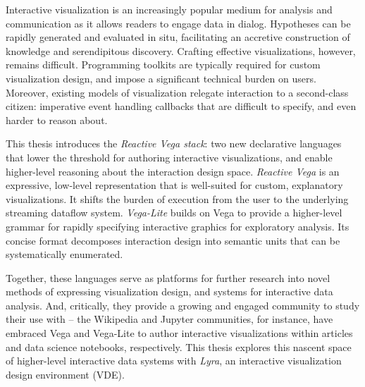 
Interactive visualization is an increasingly popular medium for analysis and
communication as it allows readers to engage data in dialog. Hypotheses can be
rapidly generated and evaluated in situ, facilitating an accretive construction
of knowledge and serendipitous discovery. Crafting effective visualizations,
however, remains difficult. Programming toolkits are typically required for
custom visualization design, and impose a significant technical burden on users.
Moreover, existing models of visualization relegate interaction to a
second-class citizen: imperative event handling callbacks that are difficult to
specify, and even harder to reason about.

This thesis introduces the \emph{Reactive Vega stack}: two new declarative
languages that lower the threshold for authoring interactive visualizations, and
enable higher-level reasoning about the interaction design space. \emph{Reactive
Vega} is an expressive, low-level representation that is well-suited for custom,
explanatory visualizations. It shifts the burden of execution from the user to
the underlying streaming dataflow system. \emph{Vega-Lite} builds on Vega to
provide a higher-level grammar for rapidly specifying interactive graphics for
exploratory analysis. Its concise format decomposes interaction design into
semantic units that can be systematically enumerated.

Together, these languages serve as platforms for further research into novel
methods of expressing visualization design, and systems for interactive data
analysis. And, critically, they provide a growing and engaged community to study
their use with -- the Wikipedia and Jupyter communities, for instance, have
embraced Vega and Vega-Lite to author interactive visualizations within articles
and data science notebooks, respectively. This thesis explores this nascent
space of higher-level interactive data systems with \emph{Lyra}, an interactive
visualization design environment (VDE).